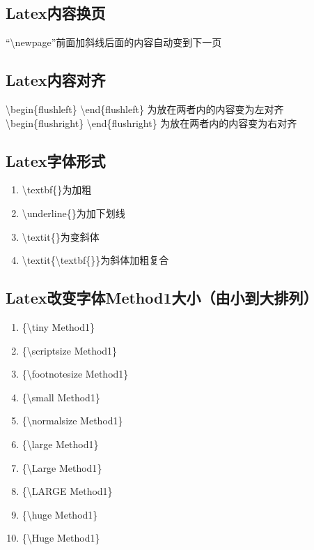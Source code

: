 \documentclass{article}
\begin{document}
\subsection{Latex内容换页}
“\textbackslash{newpage}”前面加斜线后面的内容自动变到下一页
\subsection{Latex内容对齐}
\textbackslash{begin\{flushleft\}}\newline
\textbackslash{end\{flushleft\}}\newline
为放在两者内的内容变为左对齐\newline
\textbackslash{begin\{flushright\}}\newline
\textbackslash{end\{flushright\}}\newline
为放在两者内的内容变为右对齐
\subsection{Latex字体形式}
\begin{enumerate}
\item \textbackslash{textbf\{\}}为加粗\newline
\item \textbackslash{underline\{\}}为加下划线\newline
\item \textbackslash{textit\{\}}为变斜体\newline
\item \textbackslash{textit\{\textbackslash{textbf}\{\}\}}为斜体加粗复合
\end{enumerate}
\subsection{Latex改变字体Method1大小（由小到大排列）}
\begin{enumerate}
\item \{\textbackslash{tiny Method1}\}\newline
\item \{\textbackslash{scriptsize Method1}\}\newline
\item \{\textbackslash{footnotesize Method1}\}\newline
\item \{\textbackslash{small Method1}\}\newline
\item \{\textbackslash{normalsize Method1}\}\newline
\item \{\textbackslash{large Method1}\}\newline
\item \{\textbackslash{Large Method1}\}\newline
\item \{\textbackslash{LARGE Method1}\}\newline
\item \{\textbackslash{huge Method1}\}\newline
\item \{\textbackslash{Huge Method1}\}
\end{enumerate}
\end{document}
